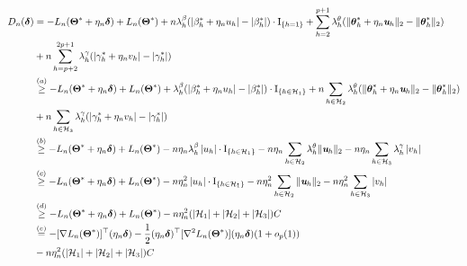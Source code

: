 \documentclass[12pt,letter]{article}\usepackage[]{graphicx}\usepackage[]{color}
\newcommand{\btheta}{\boldsymbol{\theta}}
\newcommand{\bThetastar}{\boldsymbol{\Theta}^{*}}
\newcommand{\bdelta}{\boldsymbol{\delta}}
\begin{document}
\begin{align}
D_{n}(\bdelta) & =-L_{n}(\bThetastar+\eta_{n}\bdelta)+L_{n}(\bThetastar)  + n \lambda_{h}^{\beta}(\left|\beta_{h}^*+\eta_n u_h\right| - |\beta_h^*|) \cdot \textrm{I}_{\lbrace h=1 \rbrace} +  \sum_{h=2}^{p+1}  \lambda_{h}^{\theta} (\| \btheta_{h}^* + \eta_{n}\textit{\textbf{u}}_h\|_{2} - \|\btheta_{h}^* \|_2 ) \nonumber\\  
& +n\sum_{h=p+2}^{2p+1}\lambda_{h}^{\gamma}( \left|\gamma_{h}^* + \eta_{n}v_h\right| -        \left|\gamma_{h}^*\right|) \nonumber\\
%
 & \overset{(a)}{\geq} -L_{n}(\bThetastar+\eta_{n}\bdelta)+L_{n}(\bThetastar)  
 +   \lambda_{h}^{\beta}(\left|\beta_{h}^*+\eta_n u_h\right| - |\beta_h^*|) \cdot \textrm{I}_{\lbrace h \in \mathcal{H}_1 \rbrace} +  n \sum_{h \in \mathcal{H}_2} \lambda_{h}^{\theta} (\| \btheta_{h}^* + \eta_{n}\textit{\textbf{u}}_h\|_{2} - \|\btheta_{h}^* \|_2 ) \nonumber\\  
& +n\sum_{h \in \mathcal{H}_3}\lambda_{h}^{\gamma}( \left|\gamma_{h}^* + \eta_{n}v_h\right| -        \left|\gamma_{h}^*\right|)\nonumber \\
%
 & \overset{(b)}{\geq} -L_{n}(\bThetastar+\eta_{n}\bdelta)+L_{n}(\bThetastar)  - n \eta_{n}  \lambda_{h}^{\beta}\left|u_h\right| \cdot \textrm{I}_{\lbrace h \in \mathcal{H}_1 \rbrace}  -      n \eta_{n}\sum_{h \in \mathcal{H}_2}     \lambda_{h}^{\theta} \| \textit{\textbf{u}}_h\|_{2} - n \eta_n \sum_{h \in \mathcal{H}_3}\lambda_{h}^{\gamma} \left|v_h\right| \nonumber \\
%
%
 & \overset{(c)}{\geq} -L_{n}(\bThetastar+\eta_{n}\bdelta)+L_{n}(\bThetastar)  - n \eta_{n}^2  \left|u_h\right| \cdot \textrm{I}_{\lbrace h \in \mathcal{H}_1 \rbrace}  -      n \eta_{n}^2 \sum_{h \in \mathcal{H}_2}    \| \textit{\textbf{u}}_h\|_{2} - n \eta_n^2 \sum_{h \in \mathcal{H}_3} \left|v_h\right| \nonumber \\
%
%
& \overset{(d)}{\geq} -L_{n}(\bThetastar+\eta_{n}\bdelta)+L_{n}(\bThetastar) - n \eta_{n}^2 ( |\mathcal{H}_1| + |\mathcal{H}_2| + |\mathcal{H}_3|) C \nonumber \\
%
%
%
& \overset{(e)}{=}-[\nabla L_{n}(\bThetastar)]^{\top}(\eta_{n}\bdelta)-\frac{1}{2}(\eta_{n}\bdelta)^{\top}[\nabla^{2}L_{n}(\bThetastar)](\eta_{n}\bdelta)(1+o_{p}(1)) \nonumber \\ 
& - n \eta_{n}^2 ( |\mathcal{H}_1| + |\mathcal{H}_2|+ |\mathcal{H}_3| ) C \label{eq:lemma1}
\end{align}
\end{document}
